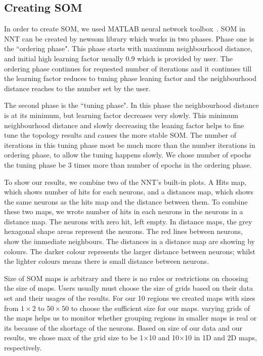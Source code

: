 \subsection{Creating SOM}
\label{sec: create_som}
     In order to create SOM, we used {\tiny MATLAB} neural network toolbox~\citep[NNT,][]{matlabtolbox}.
     SOM in {\tiny NNT} can be created by {\tiny newsom} library which works in two phases. 
     Phase one is the ``ordering phase". 
     This phase starts with maximum neighbourhood distance, and initial high learning factor usually 0.9 which is provided by user. 
     The ordering phase continues for requested number of iterations and it continues till the learning factor reduces to tuning phase leaning factor and the neighbourhood distance reaches to the number set by the user.
     
     The second phase is the ``tuning phase".
     In this phase the neighbourhood distance is at its minimum, but learning factor decreases very slowly.
     This minimum neighbourhood distance and slowly decreasing the leaning factor helps to fine tune the topology results and causes the more stable SOM. 
     The number of iterations in this tuning phase most be much more than the number iterations in ordering phase, to allow the tuning happens slowly. 
     We chose number of epochs the tuning phase be 3 times more than number of epochs in the ordering phase.
     
     To show our results, we combine two of the {\tiny NNT}'s built-in plots. 
     A Hits map, which shows number of hits for each neurons, and a distances map, which shows the same neurons as the hits map and the distance between them. 
     To combine these two maps, we wrote number of hits in each neurons in the neurons in a distance map.
     The neurons with zero hit, left empty.
     In distance maps, the grey hexagonal shape areas represent the neurons.
     The red lines between neurons, show the immediate neighbours.
     The distances in a distance map are showing by colours.
     The darker colour represents the larger distance between neurons; whilst the lighter colours means there is small distance between neurons.
      
    
     Size of SOM maps is arbitrary and there is no rules or restrictions on choosing the size of maps. 
     Users usually must choose the size of grids based on their data set and their usages of the results.
     For our 10 regions we created maps with sizes from $1\times2$ to $50\times50$ to choose the sufficient size for our maps.
     varying grids of the maps helps us to monitor whether grouping regions in smaller maps is real or its because of the shortage of the neurons.
     Based on size of our data and our results, we chose max of the grid size to be 1$\times$10 and 10$\times$10 in 1D and 2D maps, respectively. 
     
